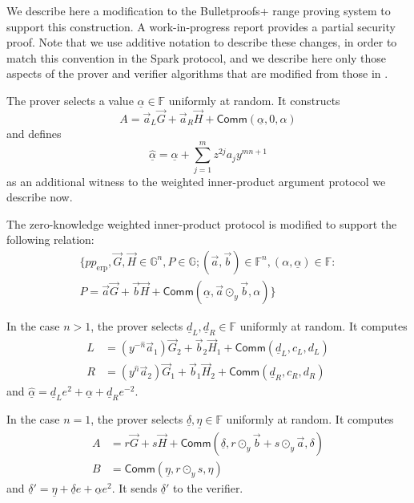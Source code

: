 \documentclass{article}
\newcommand{\G}{\mathbb{G}}
\newcommand{\F}{\mathbb{F}}
\newcommand{\func}[1]{\mathsf{#1}}
\newcommand{\comm}{\func{Comm}}
\begin{document}
We describe here a modification to the Bulletproofs+ range proving system to support this construction.
A work-in-progress report \cite{extended_bp_plus} provides a partial security proof.
Note that we use additive notation to describe these changes, in order to match this convention in the Spark protocol, and we describe here only those aspects of the prover and verifier algorithms that are modified from those in \cite{bp_plus}.

The prover selects a value $\underline{\alpha} \in \F$ uniformly at random.
It constructs $$A = \vec{a}_L \vec{G} + \vec{a}_R \vec{H} + \comm(\underline{\alpha}, 0, \alpha)$$ and defines $$\widehat{\underline{\alpha}} = \underline{\alpha} + \sum_{j=1}^m z^{2j}a_j y^{mn+1}$$ as an additional witness to the weighted inner-product argument protocol we describe now.

The zero-knowledge weighted inner-product protocol is modified to support the following relation:
\begin{multline*}
\{ pp_{\text{erp}}, \vec{G}, \vec{H} \in \G^n, P \in \G; (\vec{a}, \vec{b}) \in \F^n, (\alpha, \underline{\alpha}) \in \F : \\
P = \vec{a}\vec{G} + \vec{b}\vec{H} + \comm(\underline{\alpha}, \vec{a} \odot_y \vec{b}, \alpha) \}
\end{multline*}

In the case $n > 1$, the prover selects $\underline{d}_L, \underline{d}_R \in \F$ uniformly at random.
It computes
\begin{align*}
    L &= (y^{-\widehat{n}}\vec{a}_1)\vec{G}_2 + \vec{b}_2 \vec{H}_1 + \comm(\underline{d}_L, c_L, d_L) \\
    R &= (y^{\widehat{n}}\vec{a}_2)\vec{G}_1 + \vec{b}_1 \vec{H}_2 + \comm(\underline{d}_R, c_R, d_R)
\end{align*}
and $\widehat{\underline{\alpha}} = \underline{d}_L e^2 + \underline{\alpha} + \underline{d}_R e^{-2}$.

In the case $n = 1$, the prover selects $\underline{\delta}, \underline{\eta} \in \F$ uniformly at random.
It computes
\begin{align*}
    A &= r\vec{G} + s\vec{H} + \comm(\underline{\delta}, r \odot_y \vec{b} + s \odot_y \vec{a}, \delta) \\
    B &= \comm(\underline{\eta}, r \odot_y s, \eta)
\end{align*}
and $\underline{\delta}' = \underline{\eta} + \underline{\delta} e + \underline{\alpha} e^2$.
It sends $\underline{\delta}'$ to the verifier.
\end{document}
